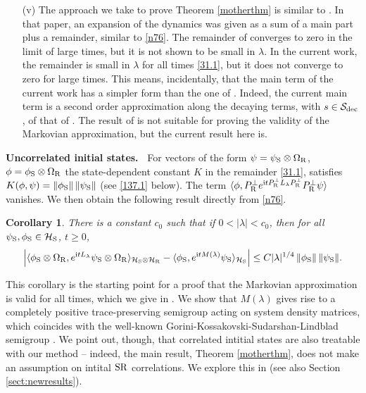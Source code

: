 \documentclass[letterpaper,onecolumn,11pt,accepted=2021-12-09]{quantumarticle}
\numberwithin{equation}{section}
\newcounter{resultcounter}[section]
\newtheorem{cor}[resultcounter]{Corollary}
\renewcommand{\r}{{\rm R}}
\newcommand{\s}{{\rm S}}
\renewcommand{\i}{{\rm i}}
\begin{document}
\begin{itemize}
\item[(v)]  The approach we take to prove Theorem \ref{motherthm} is similar to \cite{KM1}. In that paper, an expansion of the dynamics was given as a sum of a main part plus a remainder, similar to \eqref{n76}. The remainder of \cite{KM1} converges to zero in the limit of large times, but it is not shown to be small in $\lambda$. In the current work, the remainder is small in $\lambda$ for all times \eqref{31.1}, but it does not converge to zero for large times. This means, incidentally, that the main term of the current work has a simpler form than the one of \cite{KM1}. Indeed, the current main term is a second order approximation along the decaying terms, with  $s\in{\mathcal S_{\rm dec}}$, of that of \cite{KM1}. The result of \cite{KM1} is not suitable for proving the validity of the Markovian approximation, but the current result here is.
\end{itemize}




\medskip


{\bf Uncorrelated initial states.\ } For vectors of the form $\psi=\psi_\s\otimes\Omega_\r$, $\phi=\phi_\s\otimes\Omega_\r$ the state-dependent constant $K$ in the remainder \eqref{31.1}, satisfies $K(\phi,\psi)=\|\phi_\s\|\, \|\psi_\s\|$ (see \eqref{137.1} below). The term $\langle \phi, P^\perp_\r e^{\i t P^\perp_\r L_\lambda P^\perp_\r} P^\perp_\r \psi\rangle $ vanishes. We then obtain the following result directly from \eqref{n76}.
\begin{cor}
	\label{corollary1}
There is a constant $c_0$  such that if $0<|\lambda|< c_0$, then for all $\psi_\s, \phi_\s\in {\mathcal H}_\s$, $t\ge 0$, 
	\begin{equation}
	\Big| \langle\phi_\s \otimes\Omega_\r, e^{\i tL_\lambda}\psi_\s\otimes\Omega_\r \rangle_{{\mathcal H}_\s\otimes{\mathcal H}_\r}  - \langle\phi_\s, e^{\i t M(\lambda)}\psi_\s\rangle_{{\mathcal H}_\s}\Big| \leq C |\lambda|^{1/4}\, \|\phi_\s\|\, \|\psi_\s\|. 
	\label{80.1}
	\end{equation}
\end{cor}
This corollary is the starting point for a proof that the Markovian approximation is valid for all times, which we give in \cite{Markov2}.  We show that $M(\lambda)$ gives rise to a completely positive trace-preserving semigroup acting on system density matrices, which coincides with the well-known Gorini-Kossakovski-Sudarshan-Lindblad semigroup \cite{AL,CP,MAOP}. We point out, though, that correlated intitial states are also treatable with our method -- indeed, the main result, Theorem \ref{motherthm}, does not make an assumption on intital $\s\r$ correlations. We explore this in \cite{Mcorr} (see also Section \ref{sect:newresults}). 
\bigskip
\end{document}
